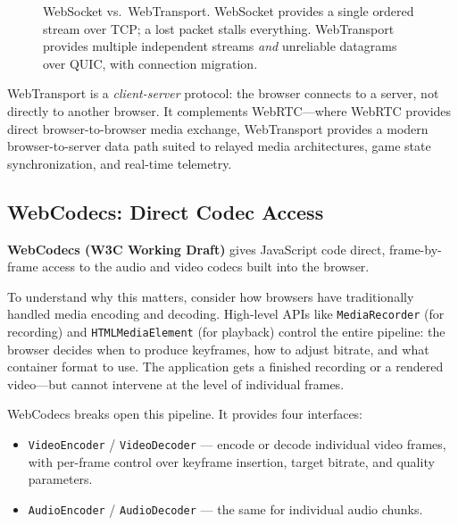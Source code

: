 \documentclass[11pt]{article}
\begin{document}
\begin{figure}[ht]
\caption{WebSocket vs.\ WebTransport.  WebSocket provides a single ordered
  stream over TCP; a lost packet stalls everything.  WebTransport provides
  multiple independent streams \emph{and} unreliable datagrams over QUIC,
  with connection migration.}
\label{fig:ws-vs-wt}
\end{figure}

WebTransport is a \emph{client-server} protocol: the browser connects to a
server, not directly to another browser.  It complements WebRTC---where
WebRTC provides direct browser-to-browser media exchange, WebTransport
provides a modern browser-to-server data path suited to relayed media
architectures, game state synchronization, and real-time telemetry.

\subsection{WebCodecs: Direct Codec Access}

\textbf{WebCodecs (W3C Working Draft)} gives JavaScript code direct,
frame-by-frame access to the audio and video codecs built into the browser.

To understand why this matters, consider how browsers have traditionally
handled media encoding and decoding.  High-level APIs like
\texttt{MediaRecorder} (for recording) and \texttt{HTMLMediaElement} (for
playback) control the entire pipeline: the browser decides when to produce
keyframes, how to adjust bitrate, and what container format to use.  The
application gets a finished recording or a rendered video---but cannot
intervene at the level of individual frames.

WebCodecs breaks open this pipeline.  It provides four interfaces:

\begin{itemize}
  \item \texttt{VideoEncoder} / \texttt{VideoDecoder} --- encode or decode
    individual video frames, with per-frame control over keyframe insertion,
    target bitrate, and quality parameters.
  \item \texttt{AudioEncoder} / \texttt{AudioDecoder} --- the same for
    individual audio chunks.
\end{itemize}
\end{document}
